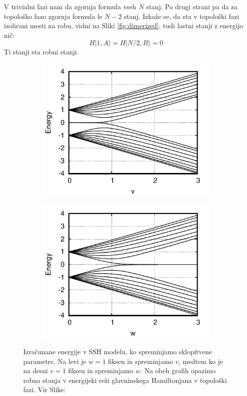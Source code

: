 V trivialni fazi nam da zgornja formula vseh $N$ stanj.  Po drugi strani pa da za topološko fazo zgornja formula le $N-2$ stanj. Izkaže se, da sta v topološki fazi izolirani mesti na robu, vidni na Sliki \ref{fig:dimerized}, tudi lastni stanji z energijo nič:
\begin{equation}
H |1, A \rangle = H | N/2, B \rangle = 0
\end{equation}
Ti stanji sta robni stanji.
\begin{figure}[H]
\centering
\begin{subfigure}{.48\textwidth}
\includegraphics[width=\linewidth]{Figures/energy.pdf}
\end{subfigure}
\begin{subfigure}{.48\textwidth}
\includegraphics[width=\linewidth]{Figures/energy2.pdf}
\end{subfigure}
\caption{Izračunane energije v SSH modelu, ko spreminjamo sklopitvene parametre. Na levi je $w=1$ fiksen in spreminjamo $v$, medtem ko je na desni $v=1$ fiksen in spreminjamo $w$. Na obeh grafih opazimo robna stanja v energijski reži glavninskega Hamiltonjana v topološki fazi. Vir Slike: \cite{arxiv}}
\label{fig:movingaway}
\end{figure}
